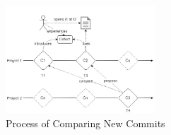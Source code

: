 \begin{figure}
  \centering
    \includegraphics[width=0.5\textwidth]{media/comparing}
    \caption{Process of Comparing New Commits\label{fig:COMPARING}}
\end{figure}
